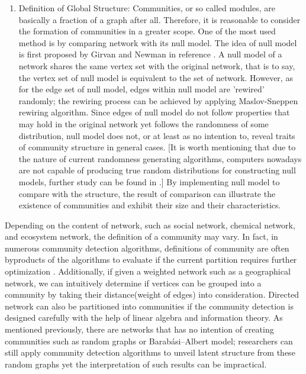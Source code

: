 \documentclass[12pt]{article}
\begin{document}
\begin{enumerate}[label=(\roman*)]
\item
    Definition of Global Structure: Communities, or so called modules, are basically a fraction of a graph after all. Therefore, it is reasonable to consider the formation of communities in a greater scope. One of the most used method is by comparing network with its null model. The idea of null model is first proposed by Girvan and Newman in reference \cite{8}. A null model of a network shares the same vertex set with the original network, that is to say, the vertex set of null model is equivalent to the set of network. However, as for the edge set of null model, edges within null model are 'rewired' randomly; the rewiring process can be achieved by applying Maslov-Sneppen rewiring algorithm\cite{22}. Since edges of null model do not follow properties that may hold in the original network yet follows the randomness of some distribution, null model does not, or at least as no intention to, reveal traits of community structure in general cases. [It is worth mentioning that due to the nature of current randomness generating algorithms, computers nowadays are not capable of producing true random distributions for constructing null models, further study can be found in \cite{21, 22}.] By implementing null model to compare with the structure, the result of comparison can illustrate the existence of communities and exhibit their size and their characteristics.

\end{enumerate}


Depending on the content of network, such as social network, chemical network, and ecosystem network, the definition of a community may vary. In fact, in numerous community detection algorithms, definitions of community are often byproducts of the algorithms to evaluate if the current partition requires further optimization \cite{19}. Additionally, if given a weighted network such as a geographical network, we can intuitively determine if vertices can be grouped into a community by taking their distance(weight of edges) into consideration. Directed network can also be partitioned into communities if the community detection is designed carefully with the help of linear algebra and information theory\cite{4}. As mentioned previously, there are networks that has no intention of creating communities such as random graphs or Barabási–Albert model\cite{5}; researchers can still apply community detection algorithms to unveil latent structure from these random graphs yet the interpretation of such results can be impractical.
\end{document}
